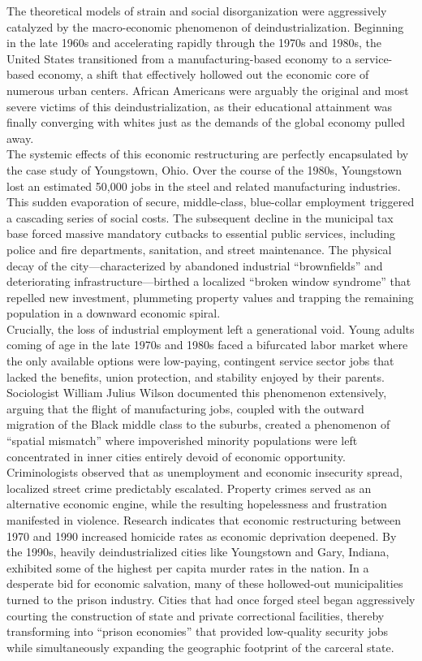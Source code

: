 \documentclass[
]{article}
\begin{document}
The theoretical models of strain and social disorganization were
aggressively catalyzed by the macro-economic phenomenon of
deindustrialization. Beginning in the late 1960s and accelerating
rapidly through the 1970s and 1980s, the United States transitioned from
a manufacturing-based economy to a service-based economy, a shift that
effectively hollowed out the economic core of numerous urban centers.
African Americans were arguably the original and most severe victims of
this deindustrialization, as their educational attainment was finally
converging with whites just as the demands of the global economy pulled
away.\\
The systemic effects of this economic restructuring are perfectly
encapsulated by the case study of Youngstown, Ohio. Over the course of
the 1980s, Youngstown lost an estimated 50,000 jobs in the steel and
related manufacturing industries. This sudden evaporation of secure,
middle-class, blue-collar employment triggered a cascading series of
social costs. The subsequent decline in the municipal tax base forced
massive mandatory cutbacks to essential public services, including
police and fire departments, sanitation, and street maintenance. The
physical decay of the city---characterized by abandoned industrial
``brownfields'' and deteriorating infrastructure---birthed a localized
``broken window syndrome'' that repelled new investment, plummeting
property values and trapping the remaining population in a downward
economic spiral.\\
Crucially, the loss of industrial employment left a generational void.
Young adults coming of age in the late 1970s and 1980s faced a
bifurcated labor market where the only available options were
low-paying, contingent service sector jobs that lacked the benefits,
union protection, and stability enjoyed by their parents. Sociologist
William Julius Wilson documented this phenomenon extensively, arguing
that the flight of manufacturing jobs, coupled with the outward
migration of the Black middle class to the suburbs, created a phenomenon
of ``spatial mismatch'' where impoverished minority populations were
left concentrated in inner cities entirely devoid of economic
opportunity.\\
Criminologists observed that as unemployment and economic insecurity
spread, localized street crime predictably escalated. Property crimes
served as an alternative economic engine, while the resulting
hopelessness and frustration manifested in violence. Research indicates
that economic restructuring between 1970 and 1990 increased homicide
rates as economic deprivation deepened. By the 1990s, heavily
deindustrialized cities like Youngstown and Gary, Indiana, exhibited
some of the highest per capita murder rates in the nation. In a
desperate bid for economic salvation, many of these hollowed-out
municipalities turned to the prison industry. Cities that had once
forged steel began aggressively courting the construction of state and
private correctional facilities, thereby transforming into ``prison
economies'' that provided low-quality security jobs while simultaneously
expanding the geographic footprint of the carceral state.
\end{document}
